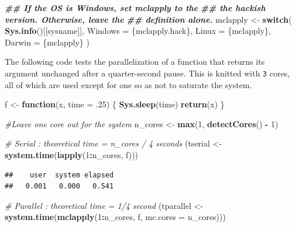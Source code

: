 \documentclass[
  12pt,
  american,
  a4paper,
  extrafontsizes,onecolumn,openright
  ]{memoir}
\newenvironment{Shaded}{\begin{snugshade}}{\end{snugshade}}
\newcommand{\AttributeTok}[1]{\textcolor[rgb]{0.13,0.29,0.53}{#1}}
\newcommand{\CommentTok}[1]{\textcolor[rgb]{0.56,0.35,0.01}{\textit{#1}}}
\newcommand{\ControlFlowTok}[1]{\textcolor[rgb]{0.13,0.29,0.53}{\textbf{#1}}}
\newcommand{\DecValTok}[1]{\textcolor[rgb]{0.00,0.00,0.81}{#1}}
\newcommand{\DocumentationTok}[1]{\textcolor[rgb]{0.56,0.35,0.01}{\textbf{\textit{#1}}}}
\newcommand{\FunctionTok}[1]{\textcolor[rgb]{0.13,0.29,0.53}{\textbf{#1}}}
\newcommand{\NormalTok}[1]{#1}
\newcommand{\OtherTok}[1]{\textcolor[rgb]{0.56,0.35,0.01}{#1}}
\newcommand{\SpecialCharTok}[1]{\textcolor[rgb]{0.81,0.36,0.00}{\textbf{#1}}}
\newcommand{\StringTok}[1]{\textcolor[rgb]{0.31,0.60,0.02}{#1}}
\begin{document}
\begin{Shaded}
\begin{Highlighting}[]
\DocumentationTok{\#\# If the OS is Windows, set mclapply to the}
\DocumentationTok{\#\# the hackish version. Otherwise, leave the}
\DocumentationTok{\#\# definition alone. }
\NormalTok{mclapply }\OtherTok{\textless{}{-}} \ControlFlowTok{switch}\NormalTok{(}
  \FunctionTok{Sys.info}\NormalTok{()[[}\StringTok{\textquotesingle{}sysname\textquotesingle{}}\NormalTok{]],}
  \AttributeTok{Windows =}\NormalTok{ \{mclapply.hack\}, }
  \AttributeTok{Linux   =}\NormalTok{ \{mclapply\},}
  \AttributeTok{Darwin  =}\NormalTok{ \{mclapply\}}
\NormalTok{)}
\end{Highlighting}
\end{Shaded}

\normalsize

The following code tests the parallelization of a function that returns its argument unchanged after a quarter-second pause.
This is knitted with \texttt{3} cores, all of which are used except for one so as not to saturate the system.

\scriptsize

\begin{Shaded}
\begin{Highlighting}[]
\NormalTok{f }\OtherTok{\textless{}{-}} \ControlFlowTok{function}\NormalTok{(x, }\AttributeTok{time =}\NormalTok{ .}\DecValTok{25}\NormalTok{) \{}
  \FunctionTok{Sys.sleep}\NormalTok{(time)}
  \FunctionTok{return}\NormalTok{(x)}
\NormalTok{\}}

\CommentTok{\#Leave one core out for the system}
\NormalTok{n\_cores }\OtherTok{\textless{}{-}} \FunctionTok{max}\NormalTok{(}\DecValTok{1}\NormalTok{, }\FunctionTok{detectCores}\NormalTok{() }\SpecialCharTok{{-}} \DecValTok{1}\NormalTok{)}

\CommentTok{\# Serial : theoretical time = n\_cores / 4 seconds}
\NormalTok{(tserial }\OtherTok{\textless{}{-}} \FunctionTok{system.time}\NormalTok{(}\FunctionTok{lapply}\NormalTok{(}\DecValTok{1}\SpecialCharTok{:}\NormalTok{n\_cores, f)))}
\end{Highlighting}
\end{Shaded}

\begin{verbatim}
##    user  system elapsed 
##   0.001   0.000   0.541
\end{verbatim}

\begin{Shaded}
\begin{Highlighting}[]
\CommentTok{\# Parallel : theoretical time = 1/4 second}
\NormalTok{(tparallel }\OtherTok{\textless{}{-}} \FunctionTok{system.time}\NormalTok{(}\FunctionTok{mclapply}\NormalTok{(}\DecValTok{1}\SpecialCharTok{:}\NormalTok{n\_cores, f, }\AttributeTok{mc.cores =}\NormalTok{ n\_cores)))}
\end{Highlighting}
\end{Shaded}
\end{document}
